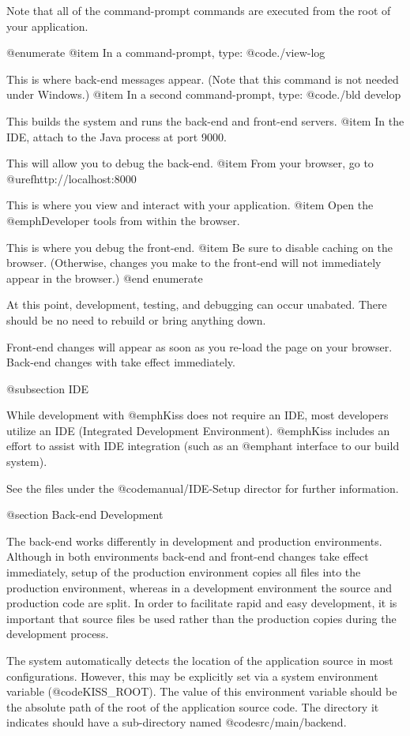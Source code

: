 Note that all of the command-prompt commands are executed from the
root of your application.

@enumerate
@item
In a command-prompt, type:  @code{./view-log}

This is where back-end messages appear. (Note that this command is not needed under Windows.)
@item
In a second command-prompt, type:  @code{./bld develop}

This builds the system and runs the back-end and front-end servers.
@item
In the IDE, attach to the Java process at port 9000.

This will allow you to debug the back-end.
@item
From your browser, go to @uref{http://localhost:8000}

This is where you view and interact with your application.
@item
Open the @emph{Developer tools} from within the browser.

This is where you debug the front-end.
@item
Be sure to disable caching on the browser. (Otherwise, changes you make to 
the front-end will not immediately appear in the browser.)
@end enumerate

At this point, development, testing, and debugging can occur unabated.
There should be no need to rebuild or bring anything down.

Front-end changes will appear as soon as you re-load the page on your browser.
Back-end changes with take effect immediately.

@subsection IDE

While development with @emph{Kiss} does not require an IDE, most
developers utilize an IDE (Integrated Development Environment).  
@emph{Kiss} includes an effort to assist with IDE integration
(such as an @emph{ant} interface to our build system).

See the files under the @code{manual/IDE-Setup} director for further
information.

@section Back-end Development

The back-end works differently in development and production
environments.  Although in both environments back-end and front-end
changes take effect immediately, setup of the production environment
copies all files into the production environment, whereas in a
development environment the source and production code are split.  In
order to facilitate rapid and easy development, it is important that
source files be used rather than the production copies during the
development process.  

The system automatically detects the location of the application
source in most configurations.  However, this may be explicitly
set via a system environment variable (@code{KISS_ROOT}).  The
value of this environment variable should be the absolute path of the
root of the application source code.  The directory it indicates
should have a sub-directory named @code{src/main/backend}.



